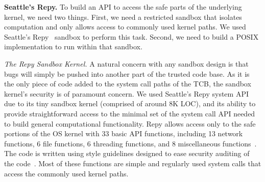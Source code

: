 %

\textbf{Seattle's Repy.}
To build an API to access the safe parts of the underlying kernel, we need
two things.  First, we need a restricted sandbox that isolates computation
and only allows access to commonly used kernel paths.  We used
Seattle's Repy~\cite{Repy-10} sandbox to perform this task.
Second, we need to build a POSIX implementation to run within that sandbox.


\textit{The Repy Sandbox Kernel.}
A natural concern with any sandbox design is that bugs will simply be pushed into
another part of the trusted code base.  As it is the only piece of code added
to the system call paths of the TCB, the sandbox kernel's security is of
paramount concern.
We used Seattle's Repy system API due to its tiny sandbox kernel
(comprised of around 8K LOC), and its ability to provide straightforward
access to the minimal set of the system call API needed to build general
computational functionality. Repy allows
access only to the safe portions of the OS kernel with 33 basic API
functions, including 13 network functions, 6 file functions, 6 threading functions,
and 8 miscellaneous functions~\cite{Repy-10, RepyKernel}. The code is
written using style guidelines designed to ease security auditing
 of the code~\cite{style}. Most of these functions are simple and
regularly used system calls that access the commonly used kernel paths.

